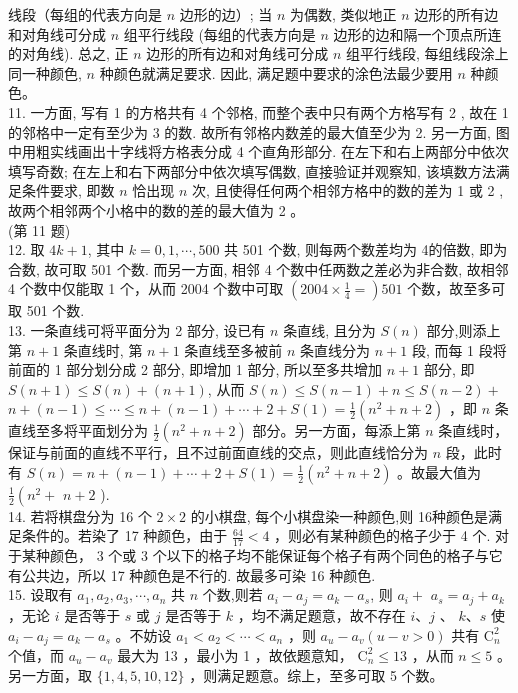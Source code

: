 \documentclass[10pt]{article}
\begin{document}
线段（每组的代表方向是 $n$ 边形的边）; 当 $n$ 为偶数, 类似地正 $n$ 边形的所有边和对角线可分成 $n$ 组平行线段 (每组的代表方向是 $n$ 边形的边和隔一个顶点所连的对角线). 总之, 正 $n$ 边形的所有边和对角线可分成 $n$ 组平行线段, 每组线段涂上同一种颜色, $n$ 种颜色就满足要求. 因此, 满足题中要求的涂色法最少要用 $n$ 种颜色。\\
11. 一方面, 写有 1 的方格共有 4 个邻格, 而整个表中只有两个方格写有 2 , 故在 1 的邻格中一定有至少为 3 的数. 故所有邻格内数差的最大值至少为 2. 另一方面, 图中用粗实线画出十字线将方格表分成 4 个直角形部分. 在左下和右上两部分中依次填写奇数; 在左上和右下两部分中依次填写偶数, 直接验证并观察知, 该填数方法满足条件要求, 即数 $n$ 恰出现 $n$ 次, 且使得任何两个相邻方格中的数的差为 1 或 2 , 故两个相邻两个小格中的数的差的最大值为 2 。\\
(第 11 题)\\
12. 取 $4 k+1$, 其中 $k=0,1, \cdots, 500$ 共 501 个数, 则每两个数差均为 4的倍数, 即为合数, 故可取 501 个数. 而另一方面, 相邻 4 个数中任两数之差必为非合数, 故相邻 4 个数中仅能取 1 个，从而 2004 个数中可取 $\left(2004 \times \frac{1}{4}=\right) 501$ 个数，故至多可取 501 个数.\\
13. 一条直线可将平面分为 2 部分, 设已有 $n$ 条直线, 且分为 $S(n)$ 部分,则添上第 $n+1$ 条直线时, 第 $n+1$ 条直线至多被前 $n$ 条直线分为 $n+1$ 段, 而每 1 段将前面的 1 部分划分成 2 部分, 即增加 1 部分, 所以至多共增加 $n+1$ 部分, 即 $S(n+1) \leqslant S(n)+(n+1)$, 从而 $S(n) \leqslant S(n-1)+n \leqslant S(n-2)+$\\
$n+(n-1) \leqslant \cdots \leqslant n+(n-1)+\cdots+2+S(1)=\frac{1}{2}\left(n^{2}+n+2\right)$ ，即 $n$ 条直线至多将平面划分为 $\frac{1}{2}\left(n^{2}+n+2\right)$ 部分。另一方面，每添上第 $n$ 条直线时，保证与前面的直线不平行，且不过前面直线的交点，则此直线恰分为 $n$ 段，此时有 $S(n)=n+(n-1)+\cdots+2+S(1)=\frac{1}{2}\left(n^{2}+n+2\right)$ 。故最大值为 $\frac{1}{2}\left(n^{2}+\right.$ $n+2$ ).\\
14. 若将棋盘分为 16 个 $2 \times 2$ 的小棋盘, 每个小棋盘染一种颜色,则 16种颜色是满足条件的。若染了 17 种颜色，由于 $\frac{64}{17}<4$ ，则必有某种颜色的格子少于 4 个. 对于某种颜色， 3 个或 3 个以下的格子均不能保证每个格子有两个同色的格子与它有公共边，所以 17 种颜色是不行的. 故最多可染 16 种颜色.\\
15. 设取有 $a_{1}, a_{2}, a_{3}, \cdots, a_{n}$ 共 $n$ 个数,则若 $a_{i}-a_{j}=a_{k}-a_{s}$, 则 $a_{i}+$ $a_{s}=a_{j}+a_{k}$ ，无论 $i$ 是否等于 $s$ 或 $j$ 是否等于 $k$ ，均不满足题意，故不存在 $i 、 j$ 、 $k 、 s$ 使 $a_{i}-a_{j}=a_{k}-a_{s}$ 。不妨设 $a_{1}<a_{2}<\cdots<a_{n}$ ，则 $a_{u}-a_{v}(u-v>0)$ 共有 $\mathrm{C}_{n}^{2}$ 个值，而 $a_{u}-a_{v}$ 最大为 13 ，最小为 1 ，故依题意知， $\mathrm{C}_{n}^{2} \leqslant 13$ ，从而 $n \leqslant 5$ 。另一方面，取 $\{1,4,5,10,12\}$ ，则满足题意。综上，至多可取 5 个数。\\
\end{document}
